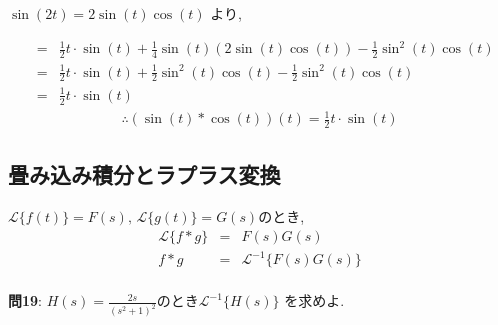 ﻿\documentclass[a4j]{jarticle}
\begin{document}
\( \sin(2t) = 2\sin(t)\cos(t) \) より,

\begin{eqnarray*}
         &=& \frac{1}{2}t\cdot\sin(t) + \frac{1}{4}\sin(t)(2\sin(t)\cos(t)) - \frac{1}{2}\sin^2(t)\cos(t) \\
         &=& \frac{1}{2}t\cdot\sin(t) + \frac{1}{2}\sin^2(t)\cos(t) - \frac{1}{2}\sin^2(t)\cos(t) \\
         &=& \frac{1}{2}t\cdot\sin(t)
\end{eqnarray*}
\begin{eqnarray*}
\therefore (\sin(t) * \cos(t))(t) = \frac{1}{2}t\cdot\sin(t)
\end{eqnarray*}

\subsection{畳み込み積分とラプラス変換}

\( \mathcal{L} \{ f(t) \} = F(s) ,\, \mathcal{L} \{ g(t) \} = G(s) \)のとき,
\begin{eqnarray*}
\mathcal{L} \{ f * g \} &=& F(s)G(s) \\
                  f * g &=& \mathcal{L}^{-1} \{ F(s)G(s) \} \\
\end{eqnarray*}

\noindent
\large{\bf{問19}}: \( H(s) = \frac{2s}{(s^2+1)^2} \text{のとき} \mathcal{L}^{-1} \{ H(s) \} \) を求めよ.
\end{document}
